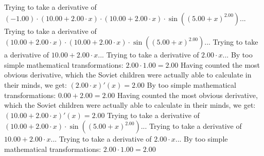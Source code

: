 \documentclass{article}
\begin{document}
\newline
Trying to take a derivative of ${\left({-1.00}\right) \cdot {\left({{10.00} + {{2.00} \cdot {x}}}\right) \cdot {\left({{10.00} + {{2.00} \cdot {x}}}\right) \cdot  \sin {\left({\left({{5.00} + {x}}\right) ^ {2.00}}\right)} }}}$...\newline
\newline
Trying to take a derivative of ${\left({{10.00} + {{2.00} \cdot {x}}}\right) \cdot {\left({{10.00} + {{2.00} \cdot {x}}}\right) \cdot  \sin {\left({\left({{5.00} + {x}}\right) ^ {2.00}}\right)} }}$...\newline
\newline
Trying to take a derivative of ${{10.00} + {{2.00} \cdot {x}}}$...\newline
\newline
Trying to take a derivative of ${{2.00} \cdot {x}}$...\newline
\newline
By too simple mathematical transformations:
 ${{2.00} \cdot {1.00}} = {2.00}$ 
 \newline
 \newline 
Having counted the most obvious derivative, which the Soviet children were actually able to calculate in their minds, we get:
$({{2.00} \cdot {x}})'(x) = {2.00}$\newline
\newline
By too simple mathematical transformations:
 ${{0.00} + {2.00}} = {2.00}$ 
 \newline
 \newline 
Having counted the most obvious derivative, which the Soviet children were actually able to calculate in their minds, we get:
$({{10.00} + {{2.00} \cdot {x}}})'(x) = {2.00}$\newline
\newline
Trying to take a derivative of ${\left({{10.00} + {{2.00} \cdot {x}}}\right) \cdot  \sin {\left({\left({{5.00} + {x}}\right) ^ {2.00}}\right)} }$...\newline
\newline
Trying to take a derivative of ${{10.00} + {{2.00} \cdot {x}}}$...\newline
\newline
Trying to take a derivative of ${{2.00} \cdot {x}}$...\newline
\newline
By too simple mathematical transformations:
 ${{2.00} \cdot {1.00}} = {2.00}$ 
 \newline
 \newline 
\end{document}
